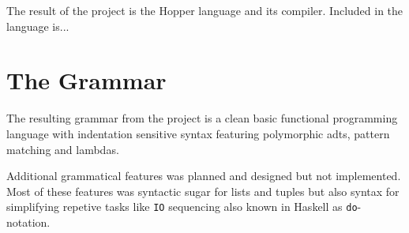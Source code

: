 

The result of the project is the Hopper language and its compiler. Included in the language is...

\section{The Grammar}
The resulting grammar from the project is a clean basic functional programming language with indentation sensitive syntax featuring polymorphic \Acrshort{adt}s, pattern matching and lambdas.

Additional grammatical features %
was planned and designed but not implemented. Most of these features was syntactic sugar  for lists and tuples but also syntax for simplifying repetive tasks like \texttt{IO} sequencing also known in Haskell as \texttt{do}-notation. 





